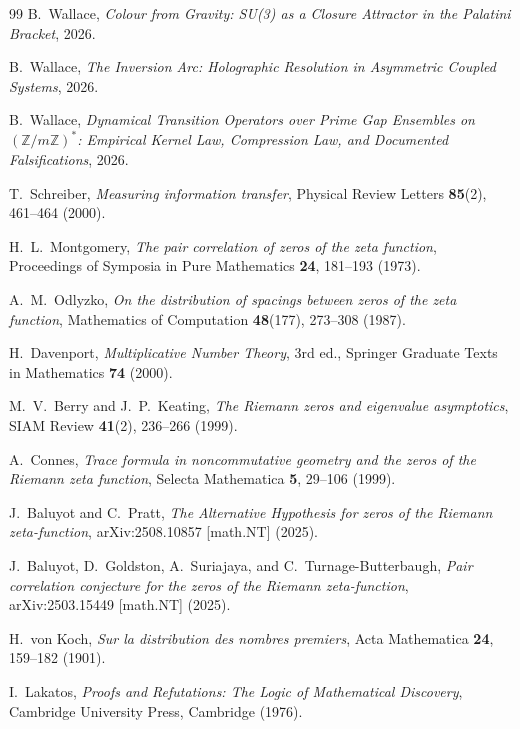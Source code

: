 \documentclass[11pt,a4paper]{article}
\theoremstyle{plain}
\theoremstyle{definition}
\theoremstyle{remark}
\begin{document}
\begin{thebibliography}{99}
B.~Wallace,
\textit{Colour from Gravity: SU(3) as a Closure Attractor in the Palatini Bracket},
2026.

B.~Wallace,
\textit{The Inversion Arc: Holographic Resolution in Asymmetric Coupled Systems},
2026.

B.~Wallace,
\textit{Dynamical Transition Operators over Prime Gap Ensembles on $(\mathbb{Z}/m\mathbb{Z})^*$: Empirical Kernel Law, Compression Law, and Documented Falsifications},
2026.

T.~Schreiber,
\textit{Measuring information transfer},
Physical Review Letters \textbf{85}(2), 461--464 (2000).

H.~L.~Montgomery,
\textit{The pair correlation of zeros of the zeta function},
Proceedings of Symposia in Pure Mathematics \textbf{24}, 181--193 (1973).

A.~M.~Odlyzko,
\textit{On the distribution of spacings between zeros of the zeta function},
Mathematics of Computation \textbf{48}(177), 273--308 (1987).

H.~Davenport,
\textit{Multiplicative Number Theory}, 3rd ed.,
Springer Graduate Texts in Mathematics \textbf{74} (2000).

M.~V.~Berry and J.~P.~Keating,
\textit{The Riemann zeros and eigenvalue asymptotics},
SIAM Review \textbf{41}(2), 236--266 (1999).

A.~Connes,
\textit{Trace formula in noncommutative geometry and the zeros of the Riemann zeta function},
Selecta Mathematica \textbf{5}, 29--106 (1999).

J.~Baluyot and C.~Pratt,
\textit{The Alternative Hypothesis for zeros of the Riemann zeta-function},
arXiv:2508.10857 [math.NT] (2025).

J.~Baluyot, D.~Goldston, A.~Suriajaya, and C.~Turnage-Butterbaugh,
\textit{Pair correlation conjecture for the zeros of the Riemann zeta-function},
arXiv:2503.15449 [math.NT] (2025).

H.~von Koch,
\textit{Sur la distribution des nombres premiers},
Acta Mathematica \textbf{24}, 159--182 (1901).

I.~Lakatos,
\textit{Proofs and Refutations: The Logic of Mathematical Discovery},
Cambridge University Press, Cambridge (1976).


\end{thebibliography}
\end{document}
